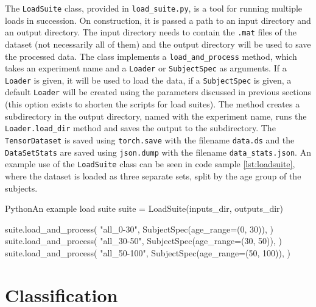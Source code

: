 \documentclass[english, he, bc, kiv, iso690alph]{fasthesis}
\begin{document}
The \texttt{LoadSuite} class, provided in \texttt{load\_suite.py}, is a tool for running multiple loads in succession. On construction, it is passed a path to an input directory and an output directory. The input directory needs to contain the \texttt{.mat} files of the dataset (not necessarily all of them) and the output directory will be used to save the processed data.
The class implements a \texttt{load\_and\_process} method, which takes an experiment name and a \texttt{Loader} or \texttt{SubjectSpec} as arguments. If a \texttt{Loader} is given, it will be used to load the data, if a \texttt{SubjectSpec} is given, a default \texttt{Loader} will be created using the parameters discussed in previous sections (this option exists to shorten the scripts for load suites).
The method creates a subdirectory in the output directory, named with the experiment name, runs the \texttt{Loader.load\_dir} method and saves the output to the subdirectory. The \texttt{TensorDataset} is saved using \texttt{torch.save} with the filename \texttt{data.ds} and the \texttt{DataSetStats} are saved using \texttt{json.dump} with the filename \texttt{data\_stats.json}. An example use of the \texttt{LoadSuite} class can be seen in code sample \ref{lst:loadsuite}, where the dataset is loaded as three separate sets, split by the age group of the subjects.

\begin{code}{Python}{An example load suite\label{lst:loadsuite}}
	suite = LoadSuite(inputs_dir, outputs_dir)

	suite.load_and_process(
	"all_0-30",
	SubjectSpec(age_range=(0, 30)),
	)
	suite.load_and_process(
	"all_30-50",
	SubjectSpec(age_range=(30, 50)),
	)
	suite.load_and_process(
	"all_50-100",
	SubjectSpec(age_range=(50, 100)),
	)
\end{code}

\section{Classification}





\backmatter
\printbibliography
\listoffigures
\listoftables
\listoflistings

\setbackpageqrcode
\backpage
\end{document}
